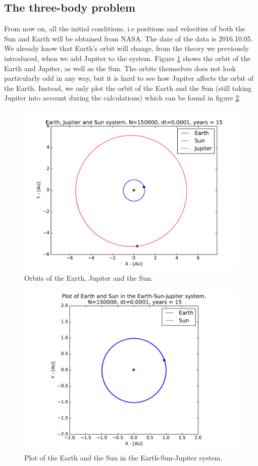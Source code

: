 \documentclass{article}
\begin{document}
\FloatBarrier
\subsection{The three-body problem}
From now on, all the initial conditions, i.e positions and velocities of both the Sun and Earth will be obtained from NASA. The date of the data is 2016.10.05. We already know that Earth's orbit will change, from the theory we previously introduced, when we add Jupiter to the system. Figure \ref{fig:EJS_2D_Orbit} shows the orbit of the Earth and Jupiter, as well as the Sun. The orbits themselves does not look particularly odd in any way, but it is hard to see how Jupiter affects the orbit of the Earth. Instead, we only plot the orbit of the Earth and the Sun (still taking Jupiter into account during the calculations) which can be found in figure \ref{fig:EJS_Earth_and_sun}. \\
\begin{figure}[!h]
\centering
\includegraphics[width=\linewidth]{Plots/Earth_Sun_Jupiter.pdf}
\caption{Orbits of the Earth, Jupiter and the Sun.}
\label{fig:EJS_2D_Orbit}
\end{figure}
\begin{figure}[!h]
\centering
\includegraphics[width=\linewidth]{Plots/ESJ_EarthandSun.pdf}
\caption{Plot of the Earth and the Sun in the Earth-Sun-Jupiter system.}
\label{fig:EJS_Earth_and_sun}
\end{figure}
\end{document}
